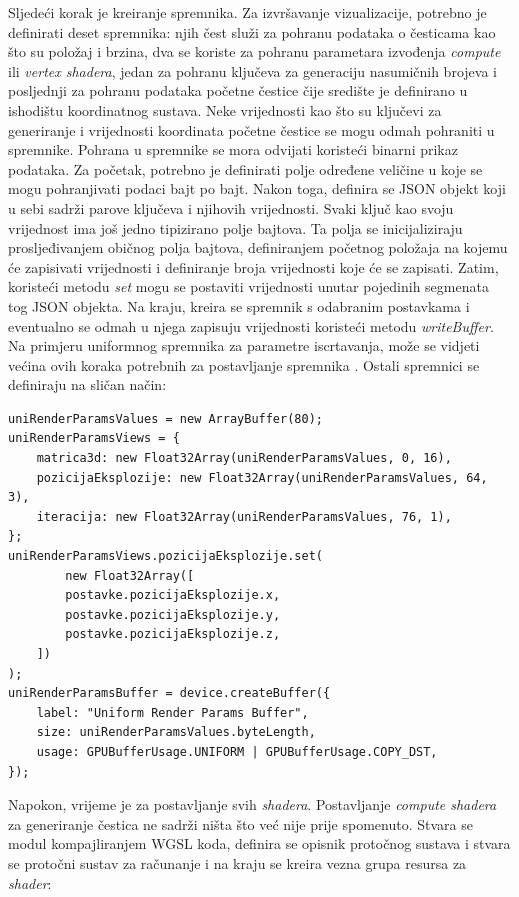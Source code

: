 \documentclass{foi}
\begin{document}
Sljedeći korak je kreiranje spremnika. Za izvršavanje vizualizacije, potrebno je definirati deset spremnika: njih čest služi za pohranu podataka o česticama kao što su položaj i brzina, dva se koriste za pohranu parametara izvođenja \textit{compute} ili \textit{vertex shadera}, jedan za pohranu ključeva za generaciju nasumičnih brojeva i posljednji za pohranu podataka početne čestice čije središte je definirano u ishodištu koordinatnog sustava. Neke vrijednosti kao što su ključevi za generiranje i vrijednosti koordinata početne čestice se mogu odmah pohraniti u spremnike. Pohrana u spremnike se mora odvijati koristeći binarni prikaz podataka. Za početak, potrebno je definirati polje određene veličine u koje se mogu pohranjivati podaci bajt po bajt. Nakon toga, definira se JSON objekt koji u sebi sadrži parove ključeva i njihovih vrijednosti. Svaki ključ kao svoju vrijednost ima još jedno tipizirano polje bajtova. Ta polja se inicijaliziraju prosljeđivanjem običnog polja bajtova, definiranjem početnog položaja na kojemu će zapisivati vrijednosti i definiranje broja vrijednosti koje će se zapisati. Zatim, koristeći metodu \textit{set} mogu se postaviti vrijednosti unutar pojedinih segmenata tog JSON objekta. Na kraju, kreira se spremnik s odabranim postavkama i eventualno se odmah u njega zapisuju vrijednosti koristeći metodu \textit{writeBuffer}. Na primjeru uniformnog spremnika za parametre iscrtavanja, može se vidjeti većina ovih koraka potrebnih za postavljanje spremnika  \parencite{WebGPUFundamentalsCopyData}. Ostali spremnici se definiraju na sličan način:
\begin{verbatim}
uniRenderParamsValues = new ArrayBuffer(80);
uniRenderParamsViews = {
	matrica3d: new Float32Array(uniRenderParamsValues, 0, 16),
	pozicijaEksplozije: new Float32Array(uniRenderParamsValues, 64, 3),
	iteracija: new Float32Array(uniRenderParamsValues, 76, 1),
};
uniRenderParamsViews.pozicijaEksplozije.set(
		new Float32Array([
		postavke.pozicijaEksplozije.x,
		postavke.pozicijaEksplozije.y,
		postavke.pozicijaEksplozije.z,
	])
);
uniRenderParamsBuffer = device.createBuffer({
	label: "Uniform Render Params Buffer",
	size: uniRenderParamsValues.byteLength,
	usage: GPUBufferUsage.UNIFORM | GPUBufferUsage.COPY_DST,
});
\end{verbatim}

Napokon, vrijeme je za postavljanje svih \textit{shadera}. Postavljanje \textit{compute shadera} za generiranje čestica ne sadrži ništa što već nije prije spomenuto. Stvara se modul kompajliranjem WGSL koda, definira se opisnik protočnog sustava i stvara se protočni sustav za računanje i na kraju se kreira vezna grupa resursa za \textit{shader}:
\end{document}
